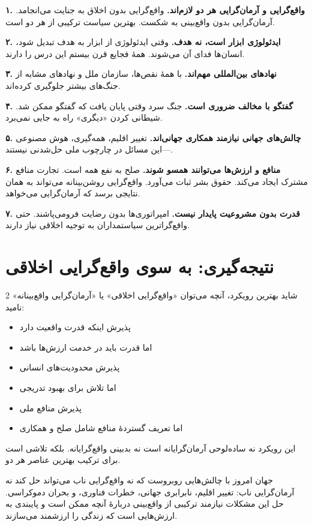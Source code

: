 \begin{tcolorbox}[
    enhanced,
    colback=goldaccent!10,
    colframe=goldaccent,
    boxrule=2pt,
    arc=8pt,
    fonttitle=\bfseries\large,
    title={\rl{🎯 درس‌های کلیدی}}
]

\textbf{۱. واقع‌گرایی و آرمان‌گرایی هر دو لازم‌اند.}
واقع‌گرایی بدون اخلاق به جنایت می‌انجامد. آرمان‌گرایی بدون واقع‌بینی به شکست. بهترین سیاست ترکیبی از هر دو است.

\textbf{۲. ایدئولوژی ابزار است، نه هدف.}
وقتی ایدئولوژی از ابزار به هدف تبدیل شود، انسان‌ها فدای آن می‌شوند. همهٔ فجایع قرن بیستم این درس را دارند.

\textbf{۳. نهادهای بین‌المللی مهم‌اند.}
با همهٔ نقص‌ها، سازمان ملل و نهادهای مشابه از جنگ‌های بیشتر جلوگیری کرده‌اند.

\textbf{۴. گفتگو با مخالف ضروری است.}
جنگ سرد وقتی پایان یافت که گفتگو ممکن شد. شیطانی کردن «دیگری» راه به جایی نمی‌برد.

\textbf{۵. چالش‌های جهانی نیازمند همکاری جهانی‌اند.}
تغییر اقلیم، همه‌گیری، هوش مصنوعی—این مسائل در چارچوب ملی حل‌شدنی نیستند.

\textbf{۶. منافع و ارزش‌ها می‌توانند همسو شوند.}
صلح به نفع همه است. تجارت منافع مشترک ایجاد می‌کند. حقوق بشر ثبات می‌آورد. واقع‌گرایی روشن‌بینانه می‌تواند به همان نتایجی برسد که آرمان‌گرایی می‌خواهد.

\textbf{۷. قدرت بدون مشروعیت پایدار نیست.}
امپراتوری‌ها بدون رضایت فرومی‌پاشند. حتی واقع‌گراترین سیاستمداران به توجیه اخلاقی نیاز دارند.

\end{tcolorbox}

\section{نتیجه‌گیری: به سوی واقع‌گرایی اخلاقی}

\begin{multicols}{2}
شاید بهترین رویکرد، آنچه می‌توان «واقع‌گرایی اخلاقی» یا «آرمان‌گرایی واقع‌بینانه» نامید:

\begin{itemize}
    \item پذیرش اینکه قدرت واقعیت دارد
    \item اما قدرت باید در خدمت ارزش‌ها باشد
    \item پذیرش محدودیت‌های انسانی
    \item اما تلاش برای بهبود تدریجی
    \item پذیرش منافع ملی
    \item اما تعریف گستردهٔ منافع شامل صلح و همکاری
\end{itemize}

این رویکرد نه ساده‌لوحی آرمان‌گرایانه است نه بدبینی واقع‌گرایانه. بلکه تلاشی است برای ترکیب بهترین عناصر هر دو.

جهان امروز با چالش‌هایی روبروست که نه واقع‌گرایی ناب می‌تواند حل کند نه آرمان‌گرایی ناب: تغییر اقلیم، نابرابری جهانی، خطرات فناوری، و بحران دموکراسی. حل این مشکلات نیازمند ترکیبی از واقع‌بینی دربارهٔ آنچه ممکن است و پایبندی به ارزش‌هایی است که زندگی را ارزشمند می‌سازند.
\end{multicols}

